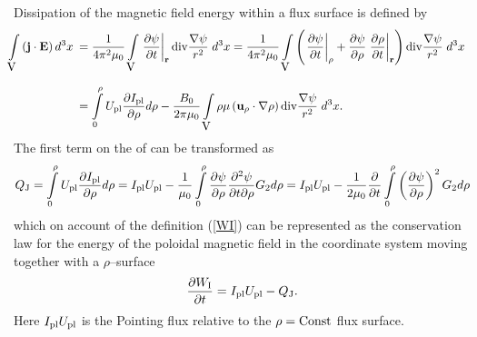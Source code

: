 Dissipation of the magnetic field energy within a flux surface
is defined by 
\begin{equation}\label{QJ1}\hspace*{-10pt}
\begin{array}{rl}\ds
\int\limits_{\mbox{\msym V}} \left({\bf j\cdot E}\right) d^3x
&\!\!\!\dstyle
=\frac{1}{4\pi^2\mu_0}\int\limits_{\mbox{\msym V}} 
\left.\prti{\psi}{t}\right|_\br
{\rm div}\frac{\nabla\psi}{r^2}\;d^3x
=\frac{1}{4\pi^2\mu_0}\int\limits_{\mbox{\msym V}} 
\lb(\left.\prti{\psi}{t}\right|_\rho
+\prti{\psi}{\rho}\left.\prti{\rho}{t}\right|_\br\rb)
{\rm div}\frac{\nabla\psi}{r^2}\;d^3x
\bigskip\\ &\!\!\!\dstyle
=\int\limits_0^\rho U_{\rm pl}\prti{I_{\rm pl}}{\rho}d\rho
-\frac{B_0}{2\pi\mu_0}\int\limits_{\mbox{\msym V}} 
\rho\mu\left({\bf u}_\rho\cdot\nb\rho\right)
{\rm div}\frac{\nabla\psi}{r^2}\;d^3x
.\end{array}
\end{equation}
The first term on the \rhs of  can be transformed as
\begin{equation}\label{QJ2}
Q_{\rm J}
=\int\limits_0^\rho U_{\rm pl}\displaystyle{\partial I_{\rm pl}\over\partial \rho}d\rho
=I_{\rm pl}U_{\rm pl}
-\frac{1}{\mu_0}
\int\limits_0^\rho
\displaystyle{\partial \psi\over\partial \rho}\displaystyle{\partial^2 \psi\over\partial t\partial \rho} G_2 d\rho
=I_{\rm pl}U_{\rm pl}
-\frac{1}{2\mu_0}
\displaystyle{\partial \over\partial t}
\int\limits_0^\rho
\left(\displaystyle{\partial \psi\over\partial \rho}\right)^2 G_2 d\rho
\end{equation}
which on account of the definition (\ref{WI}) can be represented as
the conservation law for the energy of the poloidal magnetic field in
the coordinate system moving together with a $\rho$--surface 
\begin{equation}\label{WIcons}
\displaystyle{\partial W_{\rm I}\over\partial t}
=I_{\rm pl}U_{\rm pl}-Q_{\rm J}
.\end{equation}
Here $I_{\rm pl}U_{\rm pl}$ is the Pointing flux relative to the
$\rho={\rm Const}$ flux surface. 

